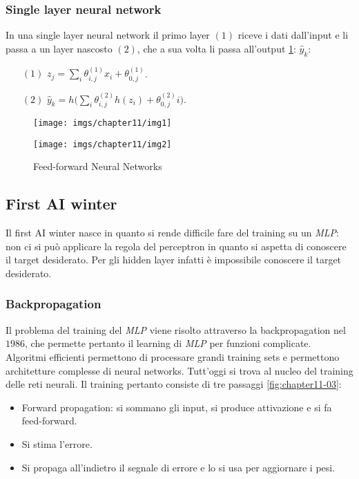 		\subsubsection{Single layer neural network}
		In una single layer neural network il primo layer $(1)$ riceve i dati dall'input e li passa a un layer nascosto $(2)$, che a sua volta li passa all'output \ref{fig:chapter11-02}: $\hat{y}_k$:
		\begin{itemize}
			\item[$(1)$] $z_j = \sum\limits_i\theta^{(1)}_{i,j}x_i + \theta_{0,j}^{(1)}$.
			\item[$(2)$] $\hat{y}_k = h\bigl(\sum\limits_i\theta^{(2)}_{i,j}h(z_i)+\theta^{(2)}_{0,j}i\bigr)$.
		\end{itemize}
		\begin{figure}
			\centering
			\begin{minipage}{.5\textwidth}
				\centering
				\texttt{[image: imgs/chapter11/img1]}
				\caption{Problemi linearmente e non linearmente separabili}
				\label{fig:chapter11-01}
			\end{minipage}%
			\begin{minipage}{.5\textwidth}
				\centering
				\texttt{[image: imgs/chapter11/img2]}
				\caption{Feed-forward Neural Networks}
				\label{fig:chapter11-02}
			\end{minipage}
		\end{figure}


	\subsection{First AI winter}
	Il first AI winter nasce in quanto si rende difficile fare del training su un \emph{MLP}: non ci si pu\`o applicare la regola del perceptron in quanto si aspetta di conoscere il target desiderato.
	Per gli hidden layer infatti \`e impossibile conoscere il target desiderato.

		\subsubsection{Backpropagation}
		Il problema del training del \emph{MLP} viene risolto attraverso la backpropagation nel $1986$, che permette pertanto il learning di \emph{MLP} per funzioni complicate.
		Algoritmi efficienti permettono di processare grandi training sets e permettono architetture complesse di neural networks.
		Tutt'oggi si trova al nucleo del training delle reti neurali.
		Il training pertanto consiste di tre passaggi \ref{fig:chapter11-03}:
		\begin{multicols}{2}
			\begin{itemize}
				\item Forward propagation: si sommano gli input, si produce attivazione e si fa feed-forward.
				\item Si stima l'errore.
				\item Si propaga all'indietro il segnale di errore e lo si usa per aggiornare i pesi.
			\end{itemize}
		\end{multicols}
		
